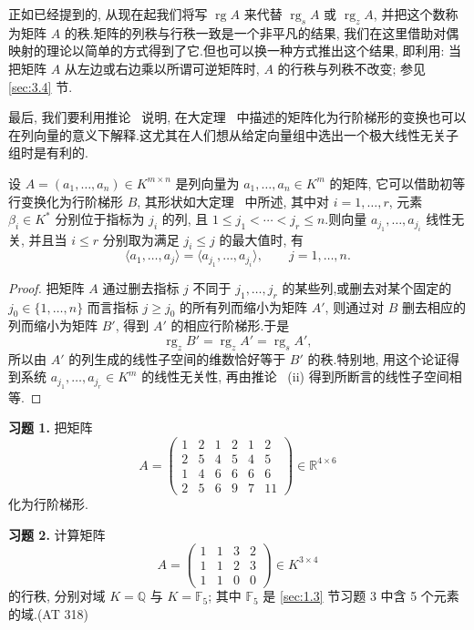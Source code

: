 正如已经提到的, 从现在起我们将写 $\operatorname{rg} A$ 来代替 $\operatorname{rg}_s A$ 或 $\operatorname{rg}_z A$, 并把这个数称为矩阵 $A$ 的秩.矩阵的列秩与行秩一致是一个非平凡的结果, 我们在这里借助对偶映射的理论以简单的方式得到了它.但也可以换一种方式推出这个结果, 即利用: 当把矩阵 $A$ 从左边或右边乘以所谓可逆矩阵时, $A$ 的行秩与列秩不改变; 参见 \ref{sec:3.4} 节.

最后, 我们要利用推论~ 说明, 在大定理~ 中描述的矩阵化为行阶梯形的变换也可以在列向量的意义下解释.这尤其在人们想从给定向量组中选出一个极大线性无关子组时是有利的.

\begin{theorem}\label{thm:3.2.11}
设 $A = (a_1, \ldots, a_n) \in K^{m \times n}$ 是列向量为 $a_1, \ldots, a_n \in K^m$ 的矩阵, 它可以借助初等行变换化为行阶梯形 $B$, 其形状如大定理~ 中所述, 其中对 $i = 1, \ldots, r$, 元素 $\beta_i \in K^*$ 分别位于指标为 $j_i$ 的列, 且 $1 \leq j_1 < \cdots < j_r \leq n$.则向量 $a_{j_1}, \ldots, a_{j_i}$ 线性无关, 并且当 $i \leq r$ 分别取为满足 $j_i \leq j$ 的最大值时, 有
\[
\langle a_1, \ldots, a_j \rangle = \langle a_{j_1}, \ldots, a_{j_i} \rangle, \qquad j = 1, \ldots, n\text{.}
\]
\end{theorem}

\begin{proof}
把矩阵 $A$ 通过删去指标 $j$ 不同于 $j_1, \ldots, j_r$ 的某些列,或删去对某个固定的 $j_0 \in \{1, \ldots, n\}$ 而言指标 $j \geq j_0$ 的所有列而缩小为矩阵 $A'$, 则通过对 $B$ 删去相应的列而缩小为矩阵 $B'$, 得到 $A'$ 的相应行阶梯形.于是
\[
\operatorname{rg}_z B' = \operatorname{rg}_z A' = \operatorname{rg}_s A',
\]
所以由 $A'$ 的列生成的线性子空间的维数恰好等于 $B'$ 的秩.特别地, 用这个论证得到系统 $a_{j_1}, \ldots, a_{j_r} \in K^m$ 的线性无关性, 再由推论~ (ii) 得到所断言的线性子空间相等.
\end{proof}

\aufgaben

\noindent\textbf{习题 1.} 把矩阵
\[
A = \begin{pmatrix}
1 & 2 & 1 & 2 & 1 & 2 \\
2 & 5 & 4 & 5 & 4 & 5 \\
1 & 4 & 6 & 6 & 6 & 6 \\
2 & 5 & 6 & 9 & 7 & 11
\end{pmatrix} \in \mathbb{R}^{4 \times 6}
\]
化为行阶梯形.

\noindent\textbf{习题 2.} 计算矩阵
\[
A = \begin{pmatrix}
1 & 1 & 3 & 2 \\
1 & 1 & 2 & 3 \\
1 & 1 & 0 & 0
\end{pmatrix} \in K^{3 \times 4}
\]
的行秩, 分别对域 $K = \mathbb{Q}$ 与 $K = \mathbb{F}_5$; 其中 $\mathbb{F}_5$ 是 \ref{sec:1.3} 节习题 3 中含 5 个元素的域.(AT 318)

